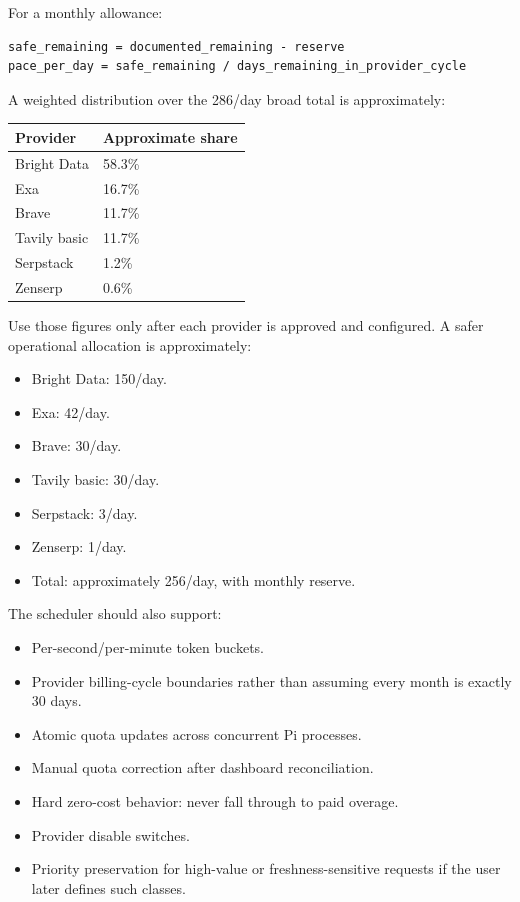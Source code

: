 \documentclass[11pt]{article}
\begin{document}
For a monthly allowance:

\begin{verbatim}
safe_remaining = documented_remaining - reserve
pace_per_day = safe_remaining / days_remaining_in_provider_cycle
\end{verbatim}

A weighted distribution over the 286/day broad total is approximately:

\begin{center}
\begin{tabular}{ll}
Provider & Approximate share\\
\hline
Bright Data & 58.3\%\\
Exa & 16.7\%\\
Brave & 11.7\%\\
Tavily basic & 11.7\%\\
Serpstack & 1.2\%\\
Zenserp & 0.6\%\\
\end{tabular}
\end{center}

Use those figures only after each provider is approved and configured.  A safer
operational allocation is approximately:

\begin{itemize}
\item Bright Data: 150/day.
\item Exa: 42/day.
\item Brave: 30/day.
\item Tavily basic: 30/day.
\item Serpstack: 3/day.
\item Zenserp: 1/day.
\item Total: approximately 256/day, with monthly reserve.
\end{itemize}

The scheduler should also support:

\begin{itemize}
\item Per-second/per-minute token buckets.
\item Provider billing-cycle boundaries rather than assuming every month is exactly
30 days.
\item Atomic quota updates across concurrent Pi processes.
\item Manual quota correction after dashboard reconciliation.
\item Hard zero-cost behavior: never fall through to paid overage.
\item Provider disable switches.
\item Priority preservation for high-value or freshness-sensitive requests if the
user later defines such classes.
\end{itemize}
\end{document}
